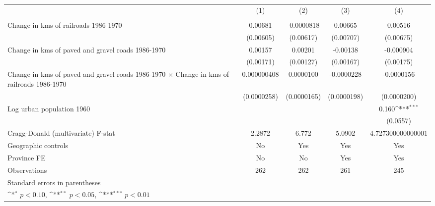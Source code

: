 {
\def\sym#1{\ifmmode^{#1}\else\(^{#1}\)\fi}
\begin{tabular}{l*{4}{c}}
\hline\hline
                &\multicolumn{1}{c}{(1)}&\multicolumn{1}{c}{(2)}&\multicolumn{1}{c}{(3)}&\multicolumn{1}{c}{(4)}\\
                &\multicolumn{1}{c}{}&\multicolumn{1}{c}{}&\multicolumn{1}{c}{}&\multicolumn{1}{c}{}\\
\hline
Change in kms of railroads 1986-1970&  0.00681         &-0.0000818         &  0.00665         &  0.00516         \\
                &(0.00605)         &(0.00617)         &(0.00707)         &(0.00675)         \\
[1em]
Change in kms of paved and gravel roads 1986-1970&  0.00157         &  0.00201         & -0.00138         &-0.000904         \\
                &(0.00171)         &(0.00127)         &(0.00167)         &(0.00175)         \\
[1em]
Change in kms of paved and gravel roads 1986-1970 $\times$ Change in kms of railroads 1986-1970&0.000000408         &0.0000100         &-0.0000228         &-0.0000156         \\
                &(0.0000258)         &(0.0000165)         &(0.0000198)         &(0.0000200)         \\
[1em]
Log urban population 1960&                  &                  &                  &    0.160\sym{***}\\
                &                  &                  &                  & (0.0557)         \\
\hline
Cragg-Donald (multivariate) F-stat&   2.2872         &    6.772         &   5.0902         &4.727300000000001         \\
Geographic controls&       No         &      Yes         &      Yes         &      Yes         \\
Province FE     &       No         &       No         &      Yes         &      Yes         \\
Observations    &      262         &      262         &      261         &      245         \\
\hline\hline
\multicolumn{5}{l}{\footnotesize Standard errors in parentheses}\\
\multicolumn{5}{l}{\footnotesize \sym{*} \(p<0.10\), \sym{**} \(p<0.05\), \sym{***} \(p<0.01\)}\\
\end{tabular}
}
